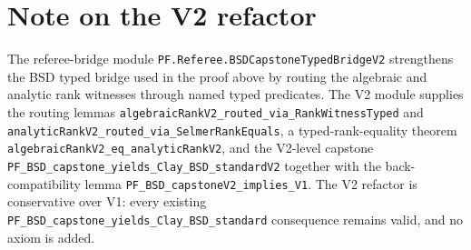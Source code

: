 \documentclass[11pt,a4paper]{article}
\theoremstyle{plain}
\theoremstyle{definition}
\begin{document}
\section*{Note on the V2 refactor}

The referee-bridge module
\texttt{PF.Referee.BSDCapstoneTypedBridgeV2}
strengthens the BSD typed bridge used in the proof above by routing
the algebraic and analytic rank witnesses through named typed
predicates.  The V2 module supplies the routing lemmas
\texttt{algebraicRankV2\_routed\_via\_RankWitnessTyped} and
\texttt{analyticRankV2\_routed\_via\_SelmerRankEquals}, a
typed-rank-equality theorem
\texttt{algebraicRankV2\_eq\_analyticRankV2}, and the V2-level
capstone
\texttt{PF\_BSD\_capstone\_yields\_Clay\_BSD\_standardV2}
together with the back-compatibility lemma
\texttt{PF\_BSD\_capstoneV2\_implies\_V1}.  The V2 refactor is
conservative over V1: every existing
\texttt{PF\_BSD\_capstone\_yields\_Clay\_BSD\_standard}
consequence remains valid, and no axiom is added.
\end{document}
